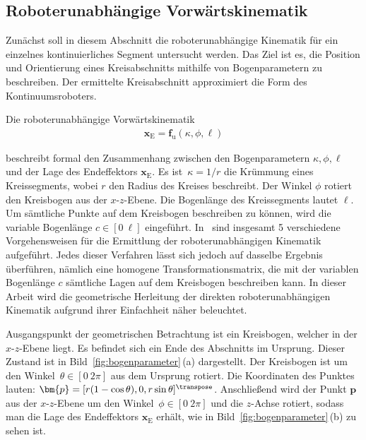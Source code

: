\subsection{Roboterunabhängige Vorwärtskinematik}
\label{subsec:unabhaengige_vorwaertskinematik}

Zunächst soll in diesem Abschnitt die roboterunabhängige Kinematik für ein einzelnes kontinuierliches Segment untersucht werden. Das Ziel ist es, die Position und Orientierung eines Kreisabschnitts mithilfe von Bogenparametern zu beschreiben. Der ermittelte Kreisabschnitt approximiert die Form des Kontinuumsroboters. \newline

Die roboterunabhängige Vorwärtskinematik
\begin{align}
\bm{x}_\mathrm{E} = \bm{f}_{\text{u}}(\kappa, \phi, \ell) 
\label{eq:funabhaengig}
\end{align}

beschreibt formal den Zusammenhang zwischen den Bogenparametern $\kappa, \phi, \ell$ und der Lage des Endeffektors $\bm{x}_{\mathrm{E}}.$ 
Es ist~\mbox{$\kappa = 1/r$} die Krümmung eines Kreissegments, wobei $r$ den Radius des Kreises beschreibt. Der Winkel $\phi$ rotiert den Kreisbogen aus der \mbox{$x$-$z$-Ebene}. Die Bogenlänge des Kreissegments lautet $\ell$. Um sämtliche Punkte auf dem Kreisbogen beschreiben zu können, wird die variable Bogenlänge \mbox{$c \in [0~\ell]$} eingeführt. In~\cite{WIJ10} sind insgesamt 5 verschiedene Vorgehensweisen für die Ermittlung der roboterunabhängigen Kinematik aufgeführt. Jedes dieser Verfahren lässt sich jedoch auf dasselbe Ergebnis überführen, nämlich eine homogene Transformationsmatrix, die mit der variablen Bogenlänge $c$ sämtliche Lagen auf dem Kreisbogen beschreiben kann. In dieser Arbeit wird die geometrische Herleitung der direkten roboterunabhängigen Kinematik aufgrund ihrer Einfachheit näher beleuchtet. 

Ausgangspunkt der geometrischen Betrachtung ist ein Kreisbogen, welcher in der \mbox{$x$-$z$-Ebene} liegt. Es befindet sich ein Ende des Abschnitts im Ursprung. Dieser Zustand ist in Bild~\ref{fig:bogenparameter}\,(a) dargestellt. Der Kreisbogen ist um den \mbox{Winkel $\theta \in [0~2\pi]$} aus dem Ursprung rotiert. 
Die Koordinaten des Punktes lauten: \mbox{$\bm{p} = [r(1-\cos\theta),0,r\sin\theta]^\transpose$}.
Anschließend wird der Punkt $\bm{p}$ aus der \mbox{$x$-$z$-Ebene} um den \mbox{Winkel~$\phi\in[0~2\pi]$} und die \mbox{$z$-Achse} rotiert, sodass man die Lage des Endeffektors $\bm{x}_{\mathrm{E}}$ erhält, wie in Bild~\ref{fig:bogenparameter}\,(b) zu sehen ist. 

